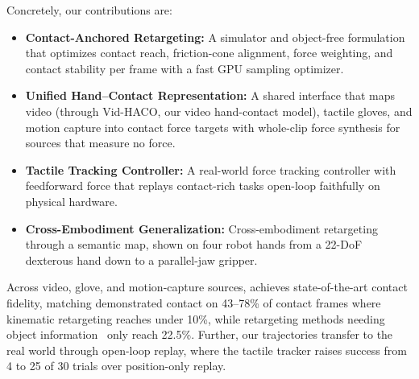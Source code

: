 

Concretely, our contributions are:
\begin{itemize}
    \item \textbf{Contact-Anchored Retargeting:} A simulator and object-free formulation that optimizes contact reach, friction-cone alignment, force weighting, and contact stability per frame with a fast GPU sampling optimizer.
    \item \textbf{Unified Hand--Contact Representation:} A shared interface that maps video (through Vid-HACO, our video hand-contact model), tactile gloves, and motion capture into contact force targets with whole-clip force synthesis for sources that measure no force.
    \item \textbf{Tactile Tracking Controller:} A real-world force tracking controller with feedforward force that replays contact-rich tasks open-loop faithfully on physical hardware.
    \item \textbf{Cross-Embodiment Generalization:} Cross-embodiment retargeting through a semantic map, shown on four robot hands from a 22-DoF dexterous hand down to a parallel-jaw gripper.
\end{itemize}

Across video, glove, and motion-capture sources, \ours achieves state-of-the-art contact fidelity, matching demonstrated contact on 43--78\% of contact frames where kinematic retargeting reaches under 10\%, while retargeting methods needing object information~\cite{regrind} only reach 22.5\%. Further, our trajectories transfer to the real world through open-loop replay, where the tactile tracker raises success from 4 to 25 of 30 trials over position-only replay.


